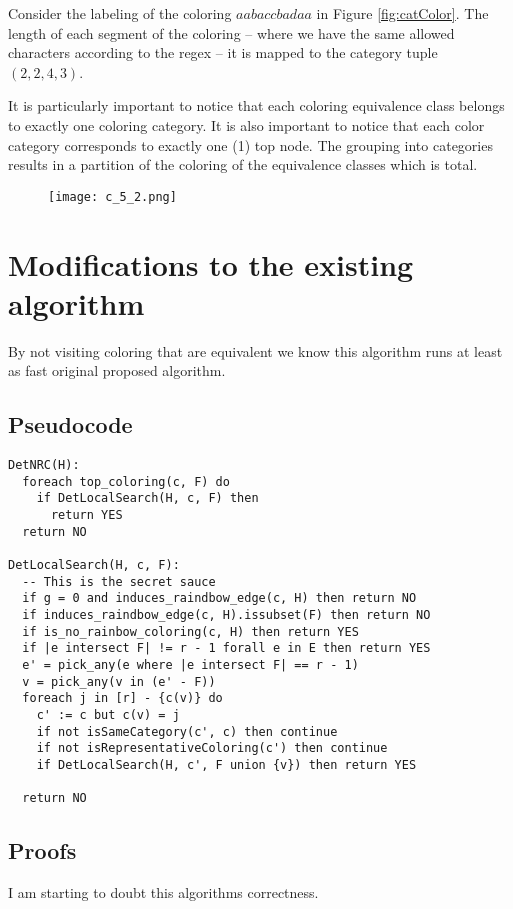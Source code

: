 \documentclass{article}
\begin{document}
Consider the labeling of the coloring $aabaccbadaa$ in Figure \ref{fig:catColor}.
The length of each segment of the coloring -- where we have the same allowed characters according to the regex -- it is mapped to the category tuple $(2, 2, 4, 3)$.

It is particularly important to notice that each coloring equivalence class belongs to exactly one coloring category. It is also important to notice that each color category corresponds to exactly one (1) top node. The grouping into categories results in a partition of the coloring of the equivalence classes which is total.

\begin{figure}[h!]
  \texttt{[image: c\_5\_2.png]}
  \caption{}
  \label{fig:catColorGrouping}
\end{figure}

\pagebreak
\section{Modifications to the existing algorithm}
By not visiting coloring that are equivalent we know this algorithm runs at least as fast original proposed algorithm.

\subsection{Pseudocode}
\begin{verbatim}
DetNRC(H):
  foreach top_coloring(c, F) do
    if DetLocalSearch(H, c, F) then
      return YES
  return NO

DetLocalSearch(H, c, F):
  -- This is the secret sauce
  if g = 0 and induces_raindbow_edge(c, H) then return NO
  if induces_raindbow_edge(c, H).issubset(F) then return NO
  if is_no_rainbow_coloring(c, H) then return YES
  if |e intersect F| != r - 1 forall e in E then return YES
  e' = pick_any(e where |e intersect F| == r - 1)
  v = pick_any(v in (e' - F))
  foreach j in [r] - {c(v)} do
    c' := c but c(v) = j
    if not isSameCategory(c', c) then continue
    if not isRepresentativeColoring(c') then continue
    if DetLocalSearch(H, c', F union {v}) then return YES

  return NO
\end{verbatim}
\pagebreak

\subsection{Proofs}
I am starting to doubt this algorithms correctness.
\end{document}
